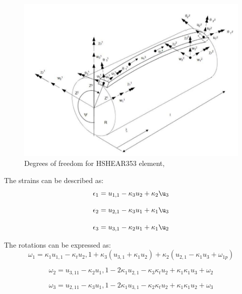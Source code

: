 \begin{figure}[H]
\centering
\includegraphics[scale=0.5]{figures/hshear353}
\caption[$\; \:$HSHEAR353]{Degrees of freedom for HSHEAR353 element, \cite{Bflextheory2013} }
 \label{fig:353}
\end{figure}


The strains can be described as:
\begin{equation}
    \epsilon_1=u_{1,1}-\kappa_3 u_2 + \kappa_2 \u_3
\end{equation}

\begin{equation}
    \epsilon_2=u_{2,1}-\kappa_3 u_1 + \kappa_1 \u_3
\end{equation}

\begin{equation}
    \epsilon_3=u_{3,1}-\kappa_2 u_1 + \kappa_1 \u_2
\end{equation}

The rotations can be expressed as:
\begin{equation}
    \omega_1=\kappa_1u_{1,1}-\kappa_t u_2,1 +\kappa_3(u_{3,1} + \kappa_1 u_2) + \kappa_2(u_{2,1}-\kappa_1 u_3 + \omega_{1p})
\end{equation}

\begin{equation}
    \omega_2=u_{3,11}-\kappa_2 u_1,1 -2\kappa_1u_{2,1} - \kappa_3 \kappa_t u_2 + \kappa_1 \kappa_1 u_{3} + \omega_{2}
\end{equation}

\begin{equation}
    \omega_3=u_{2,11}-\kappa_3 u_1,1 -2\kappa_1u_{3,1} - \kappa_2 \kappa_t u_2 + \kappa_1 \kappa_1 u_{2} + \omega_{3}
\end{equation}

